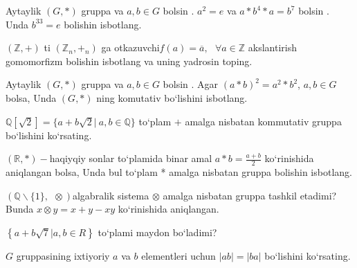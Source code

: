 Aytaylik \((G,*)\) gruppa va \(a,b \in G\) bo\textquotesingle lsin . \(a^{2} = e\) va \(a*b^{4}*a = b^{7}\) bo\textquotesingle lsin . Unda \(b^{33} = e\) bolishin isbotlang.

\(\left( \mathbb{Z}, + \right)\) ti \(\left( \mathbb{Z}_{n}, +_{n} \right)\) ga o\textquotesingle tkazuvchi\(f(a) = \overline{a},\ \ \ \forall a\mathbb{\in Z}\) akslantirish gomomorfizm bolishin isbotlang va uning yadrosin toping.

Aytaylik \((G,*)\) gruppa va \(a,b \in G\) bo\textquotesingle lsin . Agar \((a*b)^{2} = a^{2}*b^{2}\), \(a,b \in G\) bolsa, Unda \((G,*)\) ning komutativ bo`lishini isbotlang.

\(\mathbb{Q}\left\lbrack \sqrt{2} \right\rbrack = \{ a + b\sqrt{2}|\ a,b\mathbb{\in Q}\}\) to`plam \(+\) amalga nisbatan kommutativ gruppa bo`lishini ko`rsating.

\((\mathbb{R},*) -\)haqiyqiy sonlar to`plamida binar amal \(a*b = \frac{a + b}{2}\) ko`rinishida aniqlangan bolsa, Unda bul to`plam * amalga nisbatan gruppa bolishin isbotlang.

\(\left( \mathbb{Q}\backslash\{ 1\},\ \  \otimes \right)\)algabralik sistema \(\otimes\) amalga nisbatan gruppa tashkil etadimi? Bunda \(x \otimes y = x + y - xy\) ko`rinishida aniqlangan.

\(\left\{ a + b\sqrt{7}|a,b \in R \right\}\) to`plami maydon bo`ladimi?

\(G\) gruppasining ixtiyoriy \(a\) va \(b\) elementleri uchun \(|ab| = |ba|\) bo`lishini ko`rsating.
